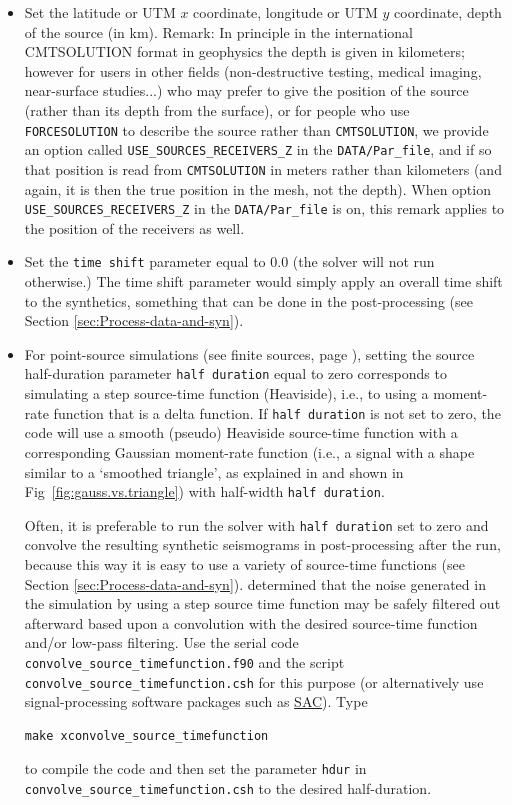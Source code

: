 \begin{itemize}
\item Set the latitude or UTM $x$ coordinate, longitude or UTM $y$ coordinate, depth of the source (in km). Remark: In principle in the international CMTSOLUTION format in geophysics
the depth is given in kilometers; however for users in other fields (non-destructive testing, medical imaging, near-surface studies...) who may prefer to give the position of the source (rather than its depth from the surface), or for people who use \texttt{FORCESOLUTION} to describe the source rather than \texttt{CMTSOLUTION}, we provide an option called \texttt{USE\_SOURCES\_RECEIVERS\_Z} in the \texttt{DATA/Par\_file}, and if so that position is read from \texttt{CMTSOLUTION} in meters rather than kilometers (and again, it is then the true position in the mesh, not the depth). When option \texttt{USE\_SOURCES\_RECEIVERS\_Z} in the \texttt{DATA/Par\_file} is on, this remark applies to the position of the receivers as well.
\item Set the \texttt{time shift} parameter equal to $0.0$ (the solver
will not run otherwise.) The time shift parameter would simply apply
an overall time shift to the synthetics, something that can be done
in the post-processing (see Section \ref{sec:Process-data-and-syn}).
\item For point-source simulations (see finite sources, page \pageref{To-simulate-a}),
setting the source half-duration parameter \texttt{half duration} equal to zero corresponds to simulating a step source-time
function (Heaviside), i.e., to using a moment-rate function that is a delta function. If
\texttt{half duration} is not set to zero, the code will use a smooth (pseudo) Heaviside source-time function
with a corresponding Gaussian moment-rate function
(i.e., a signal with a shape similar to a `smoothed triangle', as
explained in \citet{KoTr02a} and shown in Fig~\ref{fig:gauss.vs.triangle})
with half-width \texttt{half duration}.

Often, it is preferable to run the solver with \texttt{half duration} set to zero and convolve
the resulting synthetic seismograms in post-processing after the run,
because this way it is easy to use a variety of source-time functions
(see Section \ref{sec:Process-data-and-syn}). \citet{KoTr02a} determined
that the noise generated in the simulation by using a step source
time function may be safely filtered out afterward based upon a convolution
with the desired source-time function and/or low-pass filtering. Use
the serial code \texttt{convolve\_source\_timefunction.f90} and the
script \texttt{convolve\_source\_timefunction.csh} for this purpose
(or alternatively use signal-processing software packages such as \href{https://seiscode.iris.washington.edu/projects/sac}{SAC}).
Type
{\small
\begin{verbatim}
make xconvolve_source_timefunction
\end{verbatim}
}
to compile the code and then set the parameter \texttt{hdur} in \texttt{convolve\_source\_timefunction.csh}
to the desired half-duration.


\end{itemize}
